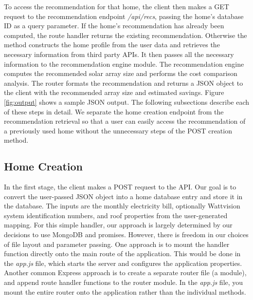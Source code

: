\documentclass[pageno]{jpaper}
\begin{document}
To access the recommendation for that home, the client then makes a GET request to the recommendation endpoint {\em /api/recs}, passing the home's database ID as a query parameter. If the home's recommendation has already been computed, the route handler returns the existing recommendation. Otherwise the method constructs the home profile from the user data and retrieves the necessary information from third party APIs. It then passes all the necessary information to the recommendation engine module. The recommendation engine computes the recommended solar array size and performs the cost comparison analysis. The router formats the recommendation and returns a JSON object to the client with the recommended array size and estimated savings. Figure \ref{fig:output} shows a sample JSON output. The following subsections describe each of these steps in detail. We separate the home creation endpoint from the recommendation retrieval so that a user can easily access the recommendation of a previously used home without the unnecessary steps of the POST creation method.

\subsection{Home Creation}
In the first stage, the client makes a POST request to the API. Our goal is to convert the user-passed JSON object into a home database entry and store it in the database. The inputs are the monthly electricity bill, optionally Wattvision system identification numbers, and roof properties from the user-generated mapping. For this simple handler, our approach is largely determined by our decisions to use MongoDB and promises. However, there is freedom in our choices of file layout and parameter passing. One approach is to mount the handler function directly onto the main route of the application. This would be done in the {\em app.js} file, which starts the server and configures the application properties. Another common Express approach is to create a separate router file (a module), and append route handler functions to the router module. In the {\em app.js} file, you mount the entire router onto the application rather than the individual methods.
\end{document}
